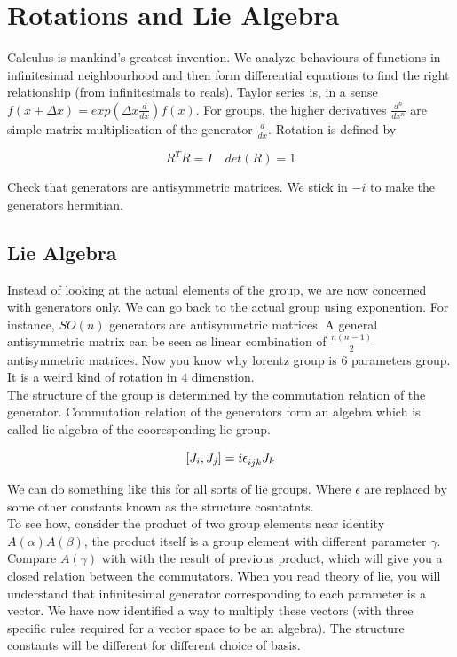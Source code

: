 \documentclass{report}
\begin{document}
\section{Rotations and Lie Algebra}

Calculus is mankind's greatest invention. We analyze behaviours of functions in infinitesimal neighbourhood and then form differential equations to find the right relationship (from infinitesimals to reals). Taylor series is, in a sense $f(x+\Delta x) = exp(\Delta x\frac{d}{dx})f(x)$. For groups, the higher derivatives $\frac{d^n}{dx^n}$ are simple matrix multiplication of the generator $\frac{d}{dx}$. Rotation is defined by

$$R^{T}R = I \quad det(R) = 1$$

\noindent Check that generators are antisymmetric matrices. We stick in $-i$ to make the generators hermitian.

\subsection{Lie Algebra}

Instead of looking at the actual elements of the group, we are now concerned with generators only. We can go back to the actual group using exponention. For instance, $SO(n)$ generators are antisymmetric matrices. A general antisymmetric matrix can be seen as linear combination of $\frac{n(n-1)}{2}$ antisymmetric matrices. Now you know why lorentz group is $6$ parameters group. It is a weird kind of rotation in $4$ dimenstion.\\

\noindent The structure of the group is determined by the commutation relation of the generator. Commutation relation of the generators form an algebra which is called lie algebra of the cooresponding lie group.

$$[J_i, J_j] = i\epsilon\indices{_i_j_k}J_k$$

\noindent We can do something like this for all sorts of lie groups. Where $\epsilon$ are replaced by some other constants known as the structure cosntatnts.\\

\noindent To see how, consider the product of two group elements near identity $A(\alpha)A(\beta)$, the product itself is a group element with different parameter $\gamma$. Compare $A(\gamma)$ with with the result of previous product, which will give you a closed relation between the commutators. When you read theory of lie, you will understand that infinitesimal generator corresponding to each parameter is a vector. We have now identified a way to multiply these vectors (with three specific rules required for a vector space to be an algebra). The structure constants will be different for different choice of basis.
\end{document}
